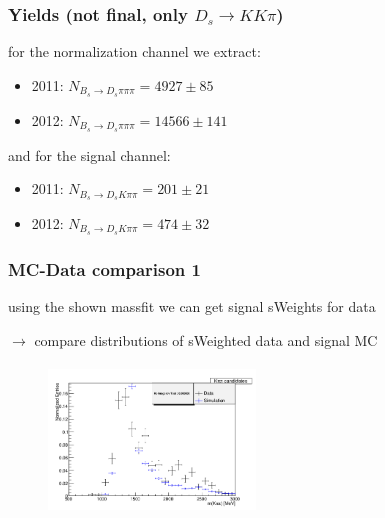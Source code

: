 \documentclass[]{beamer}
\begin{document}
\begin{frame}
\frametitle{Yields (not final, only $D_{s}\rightarrow K K \pi$)}

for the normalization channel we extract:

\begin{itemize}

\item 2011: $N_{B_{s}\rightarrow D_{s}\pi\pi\pi} = 4927 \pm 85$ \newline
\item 2012: $N_{B_{s}\rightarrow D_{s}\pi\pi\pi} = 14566 \pm 141$ \newline

\end{itemize}


and for the signal channel:

\begin{itemize}

\item 2011: $N_{B_{s}\rightarrow D_{s}K\pi\pi} = 201 \pm 21$ \newline
\item 2012: $N_{B_{s}\rightarrow D_{s}K\pi\pi} = 474 \pm 32$ \newline

\end{itemize}

\end{frame}



\begin{frame}
\frametitle{MC-Data comparison 1}

using the shown massfit we can get signal sWeights for data \newline

$\rightarrow$ compare distributions of sWeighted data and signal MC

\begin{figure}
\includegraphics[width=5.5cm,height=4.0cm]{pics/m_Kpipi_comp.png}
\end{figure}

\end{frame}
\end{document}
